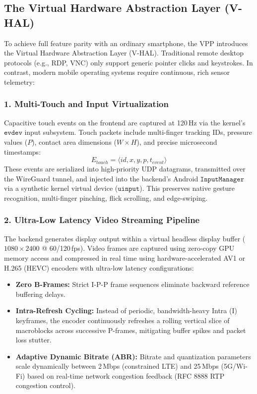 \subsection{The Virtual Hardware Abstraction Layer (V-HAL)}
To achieve full feature parity with an ordinary smartphone, the VPP introduces the Virtual Hardware Abstraction Layer (V-HAL). Traditional remote desktop protocols (e.g., RDP, VNC) only support generic pointer clicks and keystrokes. In contrast, modern mobile operating systems require continuous, rich sensor telemetry:

\subsubsection{1. Multi-Touch and Input Virtualization}
Capacitive touch events on the frontend are captured at 120\,Hz via the kernel's $\texttt{evdev}$ input subsystem. Touch packets include multi-finger tracking IDs, pressure values ($P$), contact area dimensions ($W \times H$), and precise microsecond timestamps:
\begin{equation}
    E_{touch} = \langle id, x, y, p, t_{event} \rangle
\end{equation}
These events are serialized into high-priority UDP datagrams, transmitted over the WireGuard tunnel, and injected into the backend's Android $\texttt{InputManager}$ via a synthetic kernel virtual device ($\texttt{uinput}$). This preserves native gesture recognition, multi-finger pinching, flick scrolling, and edge-swiping.

\subsubsection{2. Ultra-Low Latency Video Streaming Pipeline}
The backend generates display output within a virtual headless display buffer ($1080 \times 2400$ @ 60/120\,fps). Video frames are captured using zero-copy GPU memory access and compressed in real time using hardware-accelerated AV1 or H.265 (HEVC) encoders with ultra-low latency configurations:
\begin{itemize}
    \item \textbf{Zero B-Frames:} Strict I-P-P frame sequences eliminate backward reference buffering delays.
    \item \textbf{Intra-Refresh Cycling:} Instead of periodic, bandwidth-heavy Intra (I) keyframes, the encoder continuously refreshes a rolling vertical slice of macroblocks across successive P-frames, mitigating buffer spikes and packet loss stutter.
    \item \textbf{Adaptive Dynamic Bitrate (ABR):} Bitrate and quantization parameters scale dynamically between 2\,Mbps (constrained LTE) and 25\,Mbps (5G/Wi-Fi) based on real-time network congestion feedback (RFC 8888 RTP congestion control).
\end{itemize}

